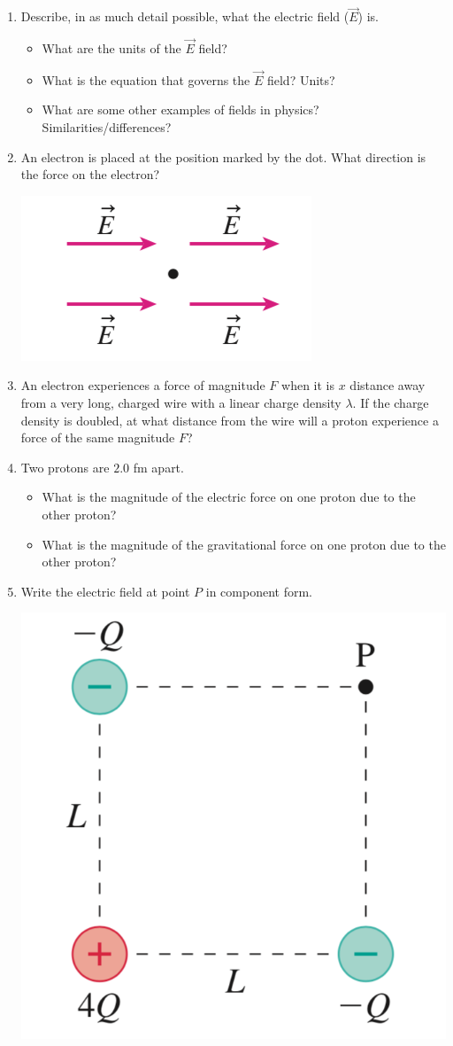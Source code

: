 \documentclass[12pt]{article}
\begin{document}
\begin{enumerate}[label=(\alph*)]

\item Describe, in as much detail possible, what the electric field ($\vec{E}$) is.
\begin{itemize}
	\item What are the units of the $\vec{E}$ field?
	\item What is the equation that governs the $\vec{E}$ field? Units?
	\item What are some other examples of fields in physics? Similarities/differences? 
\end{itemize}
 

\item An electron is placed at the position marked by the dot. What direction is the force on the electron?



\includegraphics[width=.3\linewidth]{W1_Fig1}


\item An electron experiences a force of magnitude $F$ when it is $x$ distance away from a very long, charged wire with a linear charge density $\lambda$. If the charge density is doubled, at what distance from the wire will a proton experience a force of the same magnitude $F$? 

\item Two protons are $2.0$ fm apart.
\begin{itemize}
	\item What is the magnitude of the electric force on one proton due to the other proton?
	\item What is the magnitude of the gravitational force on one proton due to the other proton?
\end{itemize} 


\item Write the electric field at point $P$ in component form.

\includegraphics[width=.3\linewidth]{W1_Fig2}

\end{enumerate}
\end{document}
